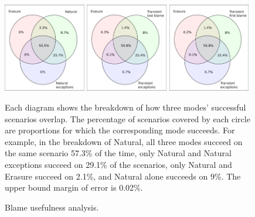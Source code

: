 \begin{figure}
  \centering
  \includegraphics[width=0.32\textwidth]{./plots/TR-TR-stack-first-venn}
  \hfill
  \includegraphics[width=0.32\textwidth]{./plots/transient-newest-transient-stack-first-venn}
  \hfill
  \includegraphics[width=0.32\textwidth]{./plots/transient-oldest-transient-stack-first-venn}

  \vspace{1em}
  \begin{minipage}{0.95\textwidth}
  Each diagram shows the breakdown of how three modes' successful scenarios overlap.
  The percentage of scenarios covered by each circle are proportions for which the corresponding mode succeeds.
  For example, in the breakdown of Natural, all three modes succeed on the same scenario 57.3\% of the time, only Natural and Natural exceptions succeed on 29.1\% of the scenarios, only Natural and Erasure succeed on 2.1\%, and Natural alone succeeds on 9\%.
  The upper bound margin of error is 0.02\%.
  \end{minipage}

  \caption{Blame usefulness analysis.}
  \label{fig:success-venns}
\end{figure}


